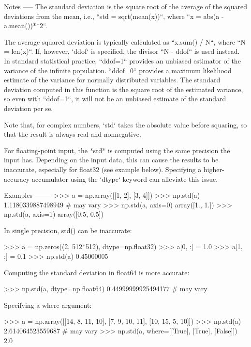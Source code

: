 \begin{DoxyVerb}
Notes
-----
The standard deviation is the square root of the average of the squared
deviations from the mean, i.e., ``std = sqrt(mean(x))``, where
``x = abs(a - a.mean())**2``.

The average squared deviation is typically calculated as ``x.sum() / N``,
where ``N = len(x)``. If, however, `ddof` is specified, the divisor
``N - ddof`` is used instead. In standard statistical practice, ``ddof=1``
provides an unbiased estimator of the variance of the infinite population.
``ddof=0`` provides a maximum likelihood estimate of the variance for
normally distributed variables. The standard deviation computed in this
function is the square root of the estimated variance, so even with
``ddof=1``, it will not be an unbiased estimate of the standard deviation
per se.

Note that, for complex numbers, `std` takes the absolute
value before squaring, so that the result is always real and nonnegative.

For floating-point input, the *std* is computed using the same
precision the input has. Depending on the input data, this can cause
the results to be inaccurate, especially for float32 (see example below).
Specifying a higher-accuracy accumulator using the `dtype` keyword can
alleviate this issue.

Examples
--------
>>> a = np.array([[1, 2], [3, 4]])
>>> np.std(a)
1.1180339887498949 # may vary
>>> np.std(a, axis=0)
array([1.,  1.])
>>> np.std(a, axis=1)
array([0.5,  0.5])

In single precision, std() can be inaccurate:

>>> a = np.zeros((2, 512*512), dtype=np.float32)
>>> a[0, :] = 1.0
>>> a[1, :] = 0.1
>>> np.std(a)
0.45000005

Computing the standard deviation in float64 is more accurate:

>>> np.std(a, dtype=np.float64)
0.44999999925494177 # may vary

Specifying a where argument:

>>> a = np.array([[14, 8, 11, 10], [7, 9, 10, 11], [10, 15, 5, 10]])
>>> np.std(a)
2.614064523559687 # may vary
>>> np.std(a, where=[[True], [True], [False]])
2.0\end{DoxyVerb}
 \mbox{\label{namespacenumpy_1_1core_1_1fromnumeric_a949e18b2f911fc8b1b9d76f876e4a0b7}} 
